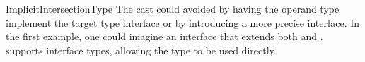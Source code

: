 \begin{pattern}{ImplicitIntersectionType}
\issues{}
The cast could avoided by having the operand type implement the target type
interface or by introducing a more precise interface.
In the first example,
one could imagine an interface  that extends both
 and .
\scala{} supports interface types,
allowing the type  to be used directly.

\end{pattern}